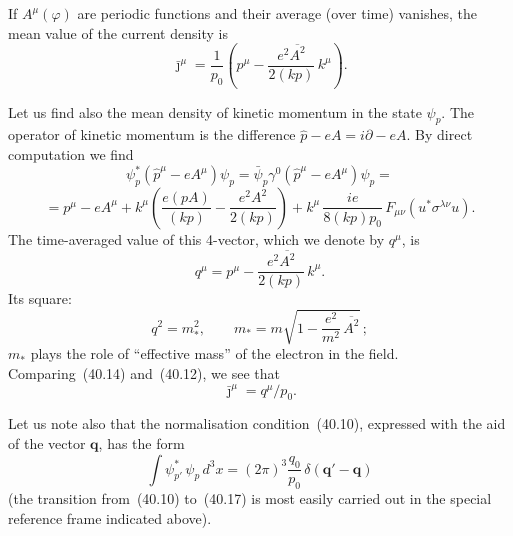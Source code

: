 If $A^\mu(\varphi)$ are periodic functions and their average (over time) vanishes, the mean value of the current density is
\begin{equation}
\bar\jmath^\mu = \frac{1}{p_0}\!\left(p^\mu - \frac{e^2\overline{A^2}}{2(kp)}\,k^\mu\right).
\tag{40.12}
\end{equation}

Let us find also the mean density of kinetic momentum in the state $\psi_p$. The operator of kinetic momentum is the difference $\widehat p - eA = i\partial - eA$. By direct computation we find
\[
\psi^*_p(\widehat p^\mu - eA^\mu)\psi_p = \bar\psi_p\gamma^0(\widehat p^\mu - eA^\mu)\psi_p =
\]
\begin{equation}
= p^\mu - eA^\mu + k^\mu\!\left(\frac{e(pA)}{(kp)} - \frac{e^2A^2}{2(kp)}\right) + k^\mu\,\frac{ie}{8(kp)p_0}\,F_{\mu\nu}(u^*\sigma^{\lambda\nu}u).
\tag{40.13}
\end{equation}
The time-averaged value of this 4-vector, which we denote by $q^\mu$, is
\begin{equation}
q^\mu = p^\mu - \frac{e^2\overline{A^2}}{2(kp)}\,k^\mu.
\tag{40.14}
\end{equation}
Its square:
\begin{equation}
q^2 = m_*^2,\qquad m_* = m\sqrt{1 - \frac{e^2}{m^2}\,\overline{A^2}}\,;
\tag{40.15}
\end{equation}
$m_*$ plays the role of ``effective mass'' of the electron in the field. Comparing~(40.14) and~(40.12), we see that
\begin{equation}
\bar\jmath^\mu = q^\mu/p_0.
\tag{40.16}
\end{equation}

Let us note also that the normalisation condition~(40.10), expressed with the aid of the vector $\mathbf{q}$, has the form
\begin{equation}
\int\psi^*_{p'}\,\psi_p\,d^3x = (2\pi)^3\frac{q_0}{p_0}\,\delta(\mathbf{q}' - \mathbf{q})
\tag{40.17}
\end{equation}
(the transition from~(40.10) to~(40.17) is most easily carried out in the special reference frame indicated above).
